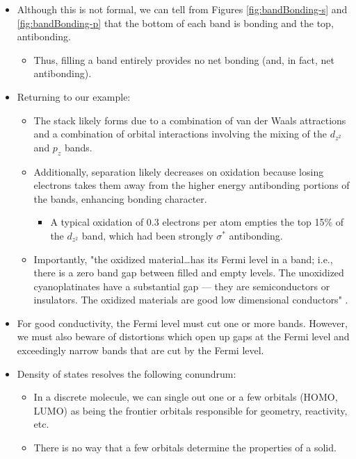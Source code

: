 \documentclass[../notes.tex]{subfiles}
\begin{document}
\begin{itemize}
    \item Although this is not formal, we can tell from Figures \ref{fig:bandBonding-s} and \ref{fig:bandBonding-p} that the bottom of each band is bonding and the top, antibonding.
    \begin{itemize}
        \item Thus, filling a band entirely provides no net bonding (and, in fact, net antibonding).
    \end{itemize}
    \item Returning to our  example:
    \begin{itemize}
        \item The stack likely forms due to a combination of van der Waals attractions and a combination of orbital interactions involving the mixing of the $d_{z^2}$ and $p_z$ bands.
        \item Additionally,  separation likely decreases on oxidation because losing electrons takes them away from the higher energy antibonding portions of the bands, enhancing bonding character.
        \begin{itemize}
            \item A typical oxidation of 0.3 electrons per  atom empties the top 15\% of the $d_{z^2}$ band, which had been strongly $\sigma^*$ antibonding.
        \end{itemize}
        \item Importantly, "the oxidized material\dots has its Fermi level in a band; i.e., there is a zero band gap between filled and empty levels. The unoxidized cyanoplatinates have a substantial gap --- they are semiconductors or insulators. The oxidized materials are good low dimensional conductors" \parencite[851-52]{bib:bandTheory}.
    \end{itemize}
    \item For good conductivity, the Fermi level must cut one or more bands. However, we must also beware of distortions which open up gaps at the Fermi level and exceedingly narrow bands that are cut by the Fermi level.
    \item Density of states resolves the following conundrum:
    \begin{itemize}
        \item In a discrete molecule, we can single out one or a few orbitals (HOMO, LUMO) as being the frontier orbitals responsible for geometry, reactivity, etc.
        \item There is no way that a few orbitals determine the properties of a solid.

\end{itemize}
\end{itemize}
\end{document}
